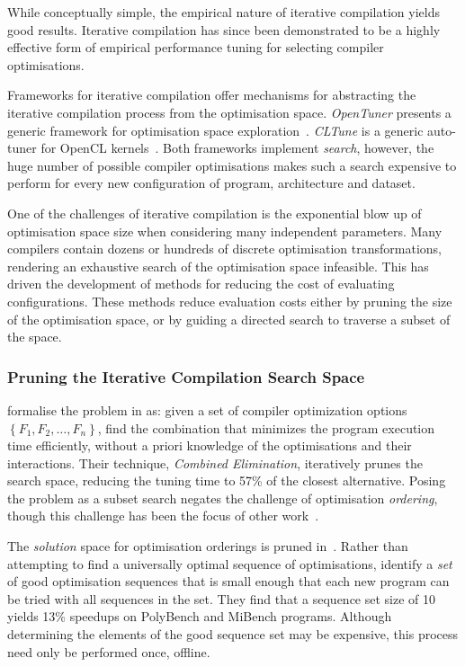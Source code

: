 While conceptually simple, the empirical nature of iterative compilation yields good results. Iterative compilation has since been demonstrated to be a highly effective form of empirical performance tuning for selecting compiler optimisations.

Frameworks for iterative compilation offer mechanisms for abstracting the iterative compilation process from the optimisation space. \emph{OpenTuner} presents a generic framework for optimisation space exploration~\cite{Ansel2013}. \emph{CLTune} is a generic auto-tuner for OpenCL kernels~\cite{Nugteren2015}. Both frameworks implement \emph{search}, however, the huge number of possible compiler optimisations makes such a search expensive to perform for every new configuration of program, architecture and dataset.

One of the challenges of iterative compilation is the exponential blow up of optimisation space size when considering many independent parameters. Many compilers contain dozens or hundreds of discrete optimisation transformations, rendering an exhaustive search of the optimisation space infeasible. This has driven the development of methods for reducing the cost of evaluating configurations. These methods reduce evaluation costs either by pruning the size of the optimisation space, or by guiding a directed search to traverse a subset of the space.


\subsubsection{Pruning the Iterative Compilation Search Space}


\citeauthor{Pan2006} formalise the problem in \cite{Pan2006} as: given a set of compiler optimization options $\left\{ F_1, F_2, \ldots, F_n \right\}$, find the combination that minimizes the program execution time efficiently, without a priori knowledge of the optimisations and their interactions. Their technique, \emph{Combined Elimination}, iteratively prunes the search space, reducing the tuning time to 57\% of the closest alternative. Posing the problem as a subset search negates the challenge of optimisation \emph{ordering}, though this challenge has been the focus of other work~\cite{Kulkarni2012,Purini2013}.

The \emph{solution} space for optimisation orderings is pruned in~\cite{Purini2013}. Rather than attempting to find a universally optimal sequence of optimisations, \citeauthor{Purini2013} identify a \emph{set} of good optimisation sequences that is small enough that each new program can be tried with all sequences in the set. They find that a sequence set size of 10 yields 13\% speedups on PolyBench and MiBench programs. Although determining the elements of the good sequence set may be expensive, this process need only be performed once, offline.

